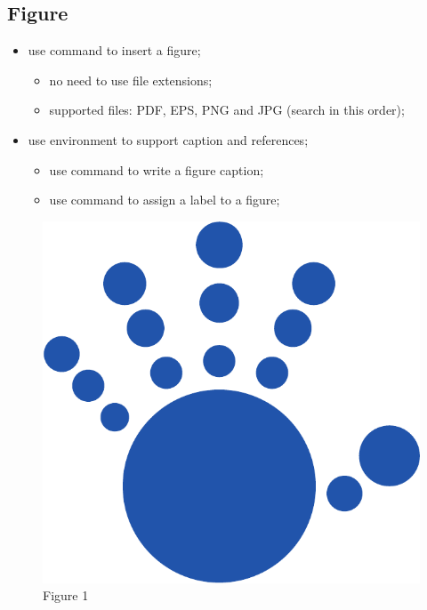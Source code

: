 \documentclass[report,english]{enacom}
\begin{document}
\subsection{Figure}
    \begin{itemize}
        \item use command  to insert a figure;
        \begin{itemize}
            \item no need to use file extensions;
            \item supported files: PDF, EPS, PNG and JPG (search in this order);
        \end{itemize}
        \item use environment  to support caption and references;
        \begin{itemize}
            \item use command  to write a figure caption;
            \item use command  to assign a label to a figure;
        \end{itemize}
    \end{itemize}
    \begin{figure}[h!]
        \includegraphics[scale=0.5]{enacomfig.pdf}
        \caption{Figure 1}
        \label{fig.figure1}
    \end{figure}
\end{document}

